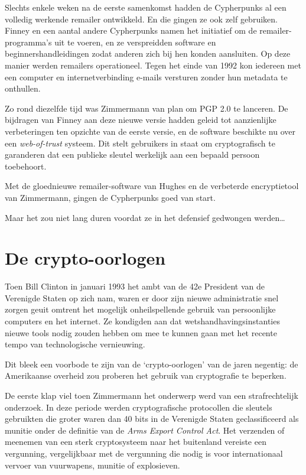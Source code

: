 \documentclass[smalldemyvopaper,11pt,twoside,onecolumn,openright,extrafontsizes,hidelinks]{memoir}
\begin{document}
Slechts enkele weken na de eerste samenkomst hadden de Cypherpunks al
een volledig werkende remailer ontwikkeld. En die gingen ze ook zelf
gebruiken. Finney en een aantal andere Cypherpunks namen het initiatief
om de remailer-programma's uit te voeren, en ze verspreidden software en
beginnershandleidingen zodat anderen zich bij hen konden aansluiten. Op
deze manier werden remailers operationeel. Tegen het einde van 1992 kon
iedereen met een computer en internetverbinding e-mails versturen zonder
hun metadata te onthullen.

Zo rond diezelfde tijd was Zimmermann van plan om PGP 2.0 te lanceren.
De bijdragen van Finney aan deze nieuwe versie hadden geleid tot
aanzienlijke verbeteringen ten opzichte van de eerste versie, en de
software beschikte nu over een \emph{web-of-trust} systeem. Dit stelt
gebruikers in staat om cryptografisch te garanderen dat een publieke
sleutel werkelijk aan een bepaald persoon toebehoort.

Met de gloednieuwe remailer-software van Hughes en de verbeterde
encryptietool van Zimmermann, gingen de Cypherpunks goed van start.

Maar het zou niet lang duren voordat ze in het defensief gedwongen
werden\ldots{}

\section{De crypto-oorlogen}\label{de-crypto-oorlogen}

Toen Bill Clinton in januari 1993 het ambt van de 42e President van de
Verenigde Staten op zich nam, waren er door zijn nieuwe administratie
snel zorgen geuit omtrent het mogelijk onheilspellende gebruik van
persoonlijke computers en het internet. Ze kondigden aan dat
wetshandhavingsinstanties nieuwe tools nodig zouden hebben om mee te
kunnen gaan met het recente tempo van technologische vernieuwing.

Dit bleek een voorbode te zijn van de `crypto-oorlogen' van de jaren
negentig: de Amerikaanse overheid zou proberen het gebruik van
cryptografie te beperken.

De eerste klap viel toen Zimmermann het onderwerp werd van een
strafrechtelijk onderzoek. In deze periode werden cryptografische
protocollen die sleutels gebruikten die groter waren dan 40 bits in de
Verenigde Staten geclassificeerd als munitie onder de definitie van de
\emph{Arms Export Control Act}. Het verzenden of meenemen van een sterk
cryptosysteem naar het buitenland vereiste een vergunning, vergelijkbaar
met de vergunning die nodig is voor internationaal vervoer van
vuurwapens, munitie of explosieven.
\end{document}
